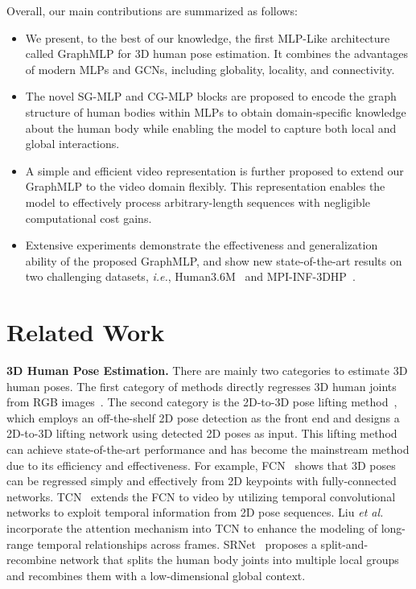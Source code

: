 \documentclass[lettersize,journal]{IEEEtran}
\begin{document}
Overall, our main contributions are summarized as follows:
\begin{itemize}
\item We present, to the best of our knowledge, the first MLP-Like architecture called GraphMLP for 3D human pose estimation. 
It combines the advantages of modern MLPs and GCNs, including globality, locality, and connectivity. 
\item The novel SG-MLP and CG-MLP blocks are proposed to encode the graph structure of human bodies within MLPs to obtain domain-specific knowledge about the human body while enabling the model to capture both local and global interactions. 
\item  A simple and efficient video representation is further proposed to extend our GraphMLP to the video domain flexibly. 
This representation enables the model to effectively process arbitrary-length sequences with negligible computational cost gains. 
\item Extensive experiments demonstrate the effectiveness and generalization ability of the proposed GraphMLP, and show new state-of-the-art results on two challenging datasets, \emph{i.e.}, Human3.6M~\cite{ionescu2013human3} and MPI-INF-3DHP~\cite{mehta2017monocular}. 
\end{itemize}

\section{Related Work} 
\noindent \textbf{3D Human Pose Estimation.}
There are mainly two categories to estimate 3D human poses. 
The first category of methods directly regresses 3D human joints from RGB images~\cite{li20143d,pavlakos2017coarse,zhou2017towards}. 
The second category is the 2D-to-3D pose lifting method~\cite{simplebaseline,videopose,li2019generating}, which employs an off-the-shelf 2D pose detection as the front end and designs a 2D-to-3D lifting network using detected 2D poses as input. 
This lifting method can achieve state-of-the-art performance and has become the mainstream method due to its efficiency and effectiveness. 
For example, FCN~\cite{simplebaseline} shows that 3D poses can be regressed simply and effectively from 2D keypoints with fully-connected networks. 
TCN~\cite{videopose} extends the FCN to video by utilizing temporal convolutional networks to exploit temporal information from 2D pose sequences. 
Liu \emph{et al.}~\cite{liu2020attention} incorporate the attention mechanism into TCN to enhance the modeling of long-range temporal relationships across frames. 
SRNet~\cite{zeng2020srnet} proposes a split-and-recombine network that splits the human body joints into multiple local groups and recombines them with a low-dimensional global context. 
\end{document}
